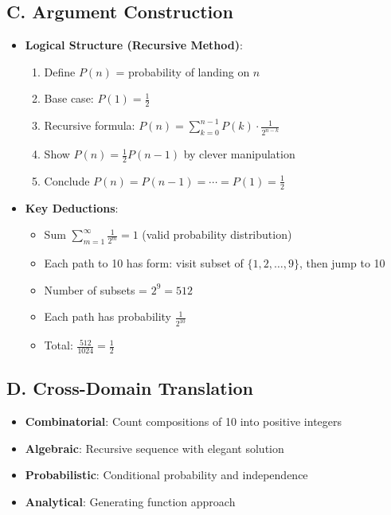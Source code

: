 \documentclass[11pt]{article}
\begin{document}
\begin{strategybox}
\subsection*{C. Argument Construction}
\begin{itemize}[leftmargin=*]
    \item \textbf{Logical Structure (Recursive Method)}:
    \begin{enumerate}
        \item Define $P(n)$ = probability of landing on $n$
        \item Base case: $P(1) = \frac{1}{2}$
        \item Recursive formula: $P(n) = \sum_{k=0}^{n-1} P(k) \cdot \frac{1}{2^{n-k}}$
        \item Show $P(n) = \frac{1}{2} P(n-1)$ by clever manipulation
        \item Conclude $P(n) = P(n-1) = \cdots = P(1) = \frac{1}{2}$
    \end{enumerate}
    \item \textbf{Key Deductions}:
    \begin{itemize}
        \item Sum $\sum_{m=1}^{\infty} \frac{1}{2^m} = 1$ (valid probability distribution)
        \item Each path to 10 has form: visit subset of $\{1,2,\ldots,9\}$, then jump to 10
        \item Number of subsets = $2^9 = 512$
        \item Each path has probability $\frac{1}{2^{10}}$
        \item Total: $\frac{512}{1024} = \frac{1}{2}$
    \end{itemize}
\end{itemize}

\subsection*{D. Cross-Domain Translation}
\begin{itemize}[leftmargin=*]
    \item \textbf{Combinatorial}: Count compositions of 10 into positive integers
    \item \textbf{Algebraic}: Recursive sequence with elegant solution
    \item \textbf{Probabilistic}: Conditional probability and independence
    \item \textbf{Analytical}: Generating function approach
\end{itemize}
\end{strategybox}
\end{document}

